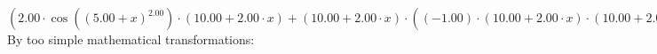 \documentclass{article}
\begin{document}
$({{{2.00} \cdot { \cos {\left({\left({{5.00} + {x}}\right) ^ {2.00}}\right)}  \cdot \left({{10.00} + {{2.00} \cdot {x}}}\right)}} + {\left({{10.00} + {{2.00} \cdot {x}}}\right) \cdot \left({{\left({-1.00}\right) \cdot {\left({{10.00} + {{2.00} \cdot {x}}}\right) \cdot {\left({{10.00} + {{2.00} \cdot {x}}}\right) \cdot  \sin {\left({\left({{5.00} + {x}}\right) ^ {2.00}}\right)} }}} + {{2.00} \cdot  \cos {\left({\left({{5.00} + {x}}\right) ^ {2.00}}\right)} }}\right)}})'(x) = {{{\left({-2.00}\right) \cdot {\left({{10.00} + {{2.00} \cdot {x}}}\right) \cdot {\left({{10.00} + {{2.00} \cdot {x}}}\right) \cdot  \sin {\left({\left({{5.00} + {x}}\right) ^ {2.00}}\right)} }}} + {{4.00} \cdot  \cos {\left({\left({{5.00} + {x}}\right) ^ {2.00}}\right)} }} + {{{\left({-2.00}\right) \cdot {\left({{10.00} + {{2.00} \cdot {x}}}\right) \cdot {\left({{10.00} + {{2.00} \cdot {x}}}\right) \cdot  \sin {\left({\left({{5.00} + {x}}\right) ^ {2.00}}\right)} }}} + {{4.00} \cdot  \cos {\left({\left({{5.00} + {x}}\right) ^ {2.00}}\right)} }} + {\left({{10.00} + {{2.00} \cdot {x}}}\right) \cdot \left({{{\left({-2.00}\right) \cdot {\left({{10.00} + {{2.00} \cdot {x}}}\right) \cdot  \sin {\left({\left({{5.00} + {x}}\right) ^ {2.00}}\right)} }} - {\left({{10.00} + {{2.00} \cdot {x}}}\right) \cdot \left({{{2.00} \cdot  \sin {\left({\left({{5.00} + {x}}\right) ^ {2.00}}\right)} } + {\left({{10.00} + {{2.00} \cdot {x}}}\right) \cdot { \cos {\left({\left({{5.00} + {x}}\right) ^ {2.00}}\right)}  \cdot \left({{10.00} + {{2.00} \cdot {x}}}\right)}}}\right)}} - {{2.00} \cdot {\left({{10.00} + {{2.00} \cdot {x}}}\right) \cdot  \sin {\left({\left({{5.00} + {x}}\right) ^ {2.00}}\right)} }}}\right)}}}$\newline
\newline
By too simple mathematical transformations:
\end{document}
